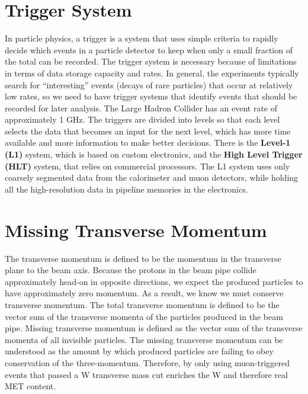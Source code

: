 \section{Trigger System}
In particle physics, a trigger is a system that uses simple criteria to rapidly decide which events in a particle detector to keep when only a small fraction of the total can be recorded.
The trigger system is necessary because of limitations in terms of data storage capacity and rates. 
In general, the experiments typically search for ``interesting'' events (decays of rare particles) that occur at relatively low rates, so we need to have trigger systems that identify events that should be recorded for later analysis. 
The Large Hadron Collider has an event rate of approximately 1 GHz. 
The triggers are divided into levels so that each level selects the data that becomes an input for the next level, which has more time available and more information to make better decisions.
There is the \textbf{Level-1 (L1)} system, which is based on custom electronics, and the \textbf{High Level Trigger (HLT)} system, that relies on commercial processors. 
The L1 system uses only coarsely segmented data from the calorimeter and muon detectors, while holding all the high-resolution data in pipeline memories in the electronics.
\section{Missing Transverse Momentum}
The transverse momentum is defined to be the momentum in the transverse plane to the beam axis. 
Because the protons in the beam pipe collide approximately head-on in opposite directions, we expect the produced particles to have approximately zero momentum. 
As a result, we know we must conserve transverse momentum. 
The total transverse momentum is defined to be the vector sum of the transverse momenta of the particles produced in the beam pipe. 
Missing transverse momentum is defined as the vector sum of the transverse momenta of all invisible particles.
The missing transverse momentum can be understood as the amount by which produced particles are failing to obey conservation of the three-momentum.
Therefore, by only using muon-triggered events that passed a W transverse mass cut enriches the W and therefore real MET content.

